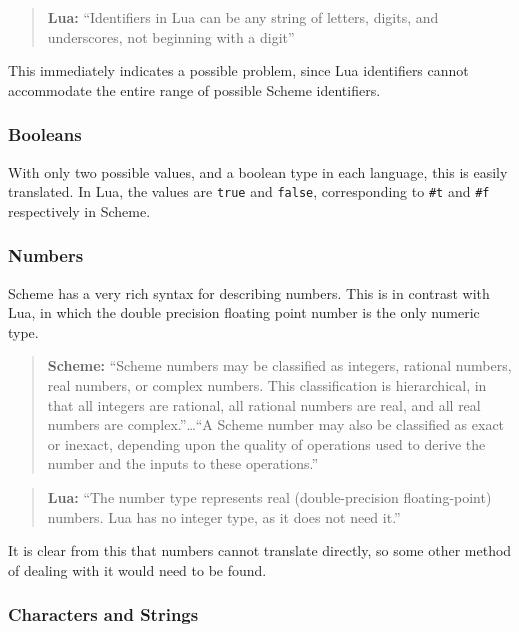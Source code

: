 \begin{quotation}\textbf{Lua:}
``Identifiers in Lua can be any string of letters, digits, and
underscores, not beginning with a digit''~\cite[p.5]{luabook}
\end{quotation}

This immediately indicates a possible problem, since Lua identifiers cannot
accommodate the entire range of possible Scheme identifiers.

\subsubsection{Booleans}

With only two possible values, and a boolean type in each language, this is
easily translated. In Lua, the values are \texttt{true} and \texttt{false},
corresponding to \texttt{\#t} and \texttt{\#f} respectively in Scheme.

\subsubsection{Numbers}

Scheme has a very rich syntax for describing numbers. This is in contrast with
Lua, in which the double precision floating point number is the only
numeric type.

\begin{quotation}\textbf{Scheme:}
``Scheme numbers may be classified as integers, rational numbers, real numbers,
or complex numbers. This classification is hierarchical, in that all integers
are rational, all rational numbers are real, and all real numbers are
complex.''\ldots ``A Scheme number may also be classified as exact or inexact,
depending upon the quality of operations used to derive the number and the
inputs to these operations.''~\cite[Sec~6.4]{tspl}
\end{quotation}

\begin{quotation}\textbf{Lua:}
``The number type represents real (double-precision floating-point) numbers. Lua
has no integer type, as it does not need it.''~\cite[p.10]{luabook}
\end{quotation}

It is clear from this that numbers cannot translate directly, so some other
method of dealing with it would need to be found.

\subsubsection{Characters and Strings}

